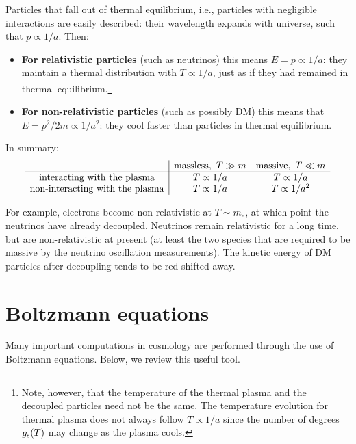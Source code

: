 Particles that fall out of thermal equilibrium, i.e., particles with negligible interactions are easily described:
their wavelength expands with universe, such that $p \propto 1/a$.  Then:
\begin{itemize}
\item {\bf For relativistic particles} (such as neutrinos) this means $E=p\propto 1/a$: they maintain a
thermal distribution with $T\propto 1/a$, just as if they had remained in thermal equilibrium.\footnote{Note, however, that the temperature of the thermal plasma and the decoupled particles need not be the same. The temperature evolution for thermal plasma does not always follow $T\propto 1/a$ since the number of degrees $g_{\rm s}(T)$ may change as the plasma cools.}
\item
{\bf For non-relativistic particles} (such as possibly DM) this means that $E = p^2/2m \propto 1/a^2$:
they cool faster than particles in thermal equilibrium.
\end{itemize}
In summary:
$$\begin{array}{c|cc} 
& \hbox{massless},~ T\gg m & \hbox{massive},~ T\ll m\\ \hline
\hbox{interacting with the plasma} & T \propto 1/a& T \propto 1/a\\
\hbox{non-interacting with the plasma} & T \propto 1/a& T \propto 1/a^2
\end{array}$$


For example, electrons become non relativistic at $T\sim m_e$, at which point the neutrinos have already decoupled. 
Neutrinos remain relativistic for a long time, but are non-relativistic at present (at least the two species that are required to be massive by the neutrino oscillation measurements). 
The kinetic energy of DM particles after decoupling tends to be red-shifted away.


\section{Boltzmann equations}\label{Boltzmann}
Many important computations in cosmology are performed through the use of  Boltzmann equations. Below, we review this useful tool. 


